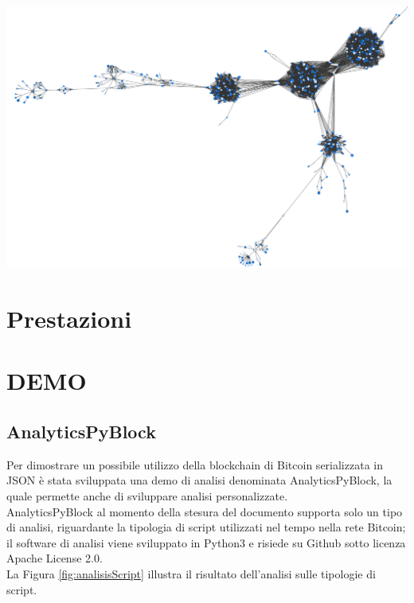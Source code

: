  {\centering
 \includegraphics[scale=0.25]{images/demo/address_graph.png}
 \vspace{10pt}
 \par}

\section{Prestazioni} \label{sec:prestazioni}


\section{DEMO} \label{sec:solDemo}

\subsection{AnalyticsPyBlock} \label{sec:AnalyticsPyBlock}

Per dimostrare un possibile utilizzo della blockchain di Bitcoin serializzata in JSON è stata sviluppata una demo di analisi denominata AnalyticsPyBlock, la quale permette anche di sviluppare analisi personalizzate.\\
AnalyticsPyBlock al momento della stesura del documento supporta solo un tipo di analisi, riguardante la tipologia di script utilizzati nel tempo nella rete Bitcoin; il software di analisi viene sviluppato in Python3 e risiede su Github sotto licenza Apache License 2.0.\\
La Figura \ref{fig:analisisScript} illustra il risultato dell'analisi sulle tipologie di script.


